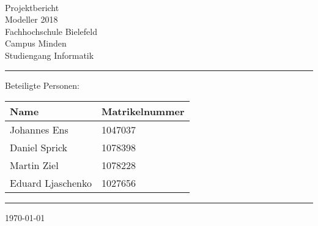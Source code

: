 


\begin{titlepage}
   \mbox{}\vspace{5\baselineskip}\\
   \sffamily\huge
   \centering
   {\Huge Projektbericht} \\
   \normalsize Modeller 2018
   \vspace{3\baselineskip}\\
   \rmfamily\Large
  Fachhochschule Bielefeld \\
  Campus Minden \\
  Studiengang Informatik
   \vspace{1\baselineskip}\\
\noindent\rule{15cm}{0.3pt}
Beteiligte Personen:
\begin{table}[H]
	\tablestyle
	\begin{tabular}{*{2}{v{0.45\textwidth}}}
		\hline
		\textbf{Name} &
		\textbf{Matrikelnummer} \tabularnewline
		\hline
		Johannes Ens & 1047037\tabularnewline
		Daniel Sprick & 1078398\tabularnewline
		Martin Ziel & 1078228\tabularnewline
		Eduard Ljaschenko& 1027656\tabularnewline

	\end{tabular}
\end{table}
   \noindent\rule{15cm}{0.4pt}

   \today
\end{titlepage}

